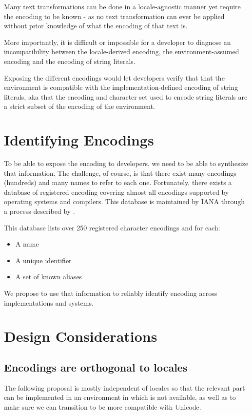 \documentclass{wg21}
\begin{document}
Many text transformations can be done in a locale-agnostic manner yet require the encoding to be known - as no text transformation can ever be applied without
prior knowledge of what the encoding of that text is.

More importantly, it is difficult or impossible for a developer to diagnose an incompatibility between the locale-derived encoding, the environment-assumed encoding and
the encoding of string literals.

Exposing the different encodings would let developers verify that that the environment is compatible with the implementation-defined encoding of string literals, aka that the encoding and character set used to encode string literals are a strict subset of the encoding of the environment.

\section{Identifying Encodings}

To be able to expose the encoding to developers, we need to be able to synthesize that information.
The challenge, of course, is that there exist many encodings (hundreds) and many names to refer to each one.
Fortunately, there exists a database of registered encoding covering almost all encodings supported by operating systems and compilers.
This database is maintained by IANA through a process described by \cite{rfc2978}.

This database lists over 250 registered character encodings and for each:
\begin{itemize}
    \item A name
    \item A unique identifier
    \item A set of known aliases
\end{itemize}

We propose to use that information to reliably identify encoding across implementations and systems.


\section{Design Considerations}

\subsection{Encodings are orthogonal to locales}

The following proposal is mostly independent of locales so that the relevant part can be implemented in an environment in which 
is not available, as well as to make sure we can transition  to be more compatible with Unicode.
\end{document}
